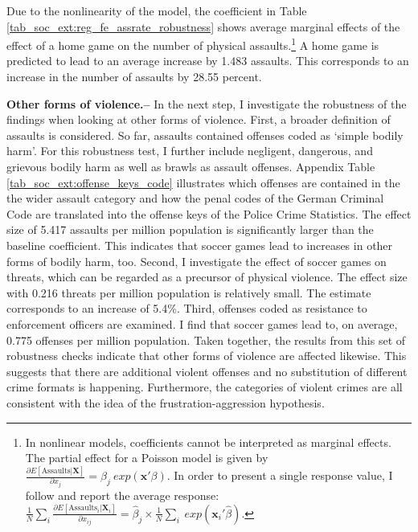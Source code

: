 \documentclass[11pt, a4paper]{article} %
\begin{document}
Due to the nonlinearity of the model, the coefficient in Table \ref{tab_soc_ext:reg_fe_assrate_robustness} shows average marginal effects of the effect of a home game on the number of physical assaults.\footnote{In nonlinear models, coefficients cannot be interpreted as marginal effects. The partial effect for a Poisson model is given by $\frac{\partial E\left[ \text{Assaults}| \mathbf{X}\right]}{\partial x_j} = \beta_j\ exp(\mathbf{x'}\beta)$. In order to present a single response value, I follow \cite{cameron2005microeconometrics} and report the average response: $\frac{1}{N}\sum_i \frac{\partial E\left[ \text{Assaults}_i| \mathbf{X}_i\right]}{\partial x_{ij}} = \hat\beta_j \times \frac{1}{N} \sum_i\ exp(\mathbf{x}_i'\hat\beta)$.} A home game is predicted to lead to an average increase by 1.483 assaults. This corresponds to an increase in the number of assaults by 28.55 percent. \newline

 
\textbf{Other forms of violence.--} In the next step, I investigate the robustness of the findings when looking at other forms of violence. First, a broader definition of assaults is considered. So far, assaults contained offenses coded as `simple bodily harm'. For this robustness test, I further include negligent, dangerous, and grievous bodily harm as well as brawls as assault offenses. Appendix Table \ref{tab_soc_ext:offense_keys_code} illustrates which offenses are contained in the the wider assault category and how the penal codes of the German Criminal Code are translated into the offense keys of the Police Crime Statistics. The effect size of 5.417 assaults per million population is significantly larger than the baseline coefficient. This indicates that soccer games lead to increases in other forms of bodily harm, too. Second, I investigate the effect of soccer games on threats, which can be regarded as a precursor of physical violence. The effect size with 0.216 threats per million population is relatively small. The estimate corresponds to an increase of 5.4\%. Third, offenses coded as resistance to enforcement officers are examined. I find that soccer games lead to, on average, 0.775 offenses per million population. Taken together, the results from this set of robustness checks indicate that other forms of violence are affected likewise. This suggests that there are additional violent offenses and no substitution of different crime formats is happening. Furthermore, the categories of violent crimes are all consistent with the idea of the frustration-aggression hypothesis.\newline
 
\end{document}
